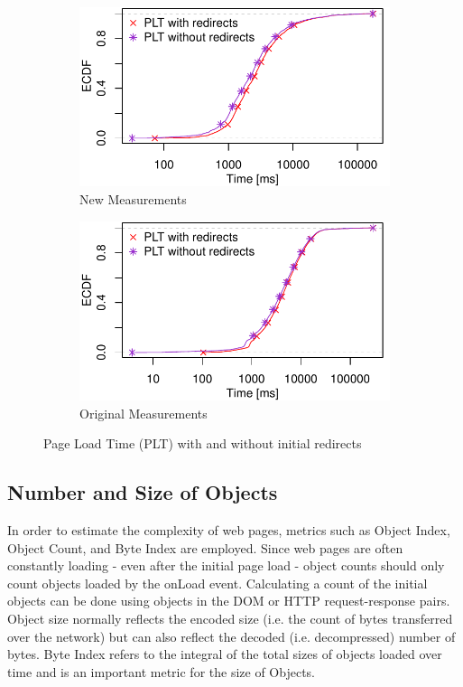 \begin{figure}
 \centering
 \begin{subfigure}{\linewidth}
		\includegraphics[width=\linewidth]{New_Plots/ecdf_loadtimes.pdf}
	\caption{New Measurements}
	\label{fig:new_plot_redirects}
\end{subfigure}\par\medskip
\begin{subfigure}{\linewidth}
		\includegraphics[width=\linewidth]{Original Plots/ecdf_loadtimes.pdf}
	\caption{Original Measurements}
	\label{fig:orig_plot_redirects}
\end{subfigure}
\caption{Page Load Time (PLT) with and without initial redirects}
\label{fig:plot_redirects}
\end{figure}

\subsection{Number and Size of Objects}
In order to estimate the complexity of web pages, metrics such as Object Index, Object Count, and Byte Index are employed. Since web pages are often constantly loading - even after the initial page load - object counts should only count objects loaded by the onLoad event. Calculating a count of the initial objects can be done using objects in the DOM or HTTP request-response pairs. Object size normally reflects the encoded size (i.e. the count of bytes transferred over the network) but can also reflect the decoded (i.e. decompressed) number of bytes. Byte Index refers to the integral of the total sizes of objects loaded over time and is an important metric for the size of Objects\cite{10.1145/2940136.2940138}.


